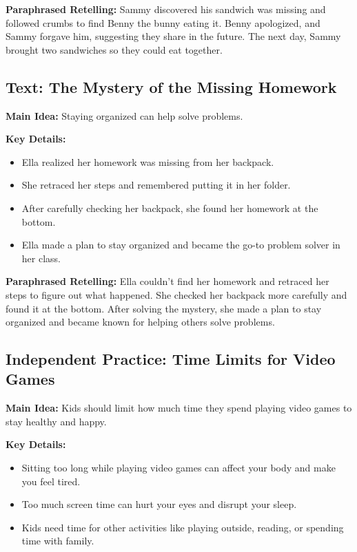 \documentclass[12pt]{article}
\begin{document}
\textbf{Paraphrased Retelling:} Sammy discovered his sandwich was missing and followed crumbs to find Benny the bunny eating it. Benny apologized, and Sammy forgave him, suggesting they share in the future. The next day, Sammy brought two sandwiches so they could eat together.

\vspace{1em}

\subsection*{Text: The Mystery of the Missing Homework}

\textbf{Main Idea:} Staying organized can help solve problems.

\textbf{Key Details:}
\begin{itemize}
    \item Ella realized her homework was missing from her backpack.
    \item She retraced her steps and remembered putting it in her folder.
    \item After carefully checking her backpack, she found her homework at the bottom.
    \item Ella made a plan to stay organized and became the go-to problem solver in her class.
\end{itemize}

\textbf{Paraphrased Retelling:} Ella couldn’t find her homework and retraced her steps to figure out what happened. She checked her backpack more carefully and found it at the bottom. After solving the mystery, she made a plan to stay organized and became known for helping others solve problems.

\vspace{1em}

\subsection*{Independent Practice: Time Limits for Video Games}

\textbf{Main Idea:} Kids should limit how much time they spend playing video games to stay healthy and happy.

\textbf{Key Details:}
\begin{itemize}
    \item Sitting too long while playing video games can affect your body and make you feel tired.
    \item Too much screen time can hurt your eyes and disrupt your sleep.
    \item Kids need time for other activities like playing outside, reading, or spending time with family.
\end{itemize}
\end{document}
